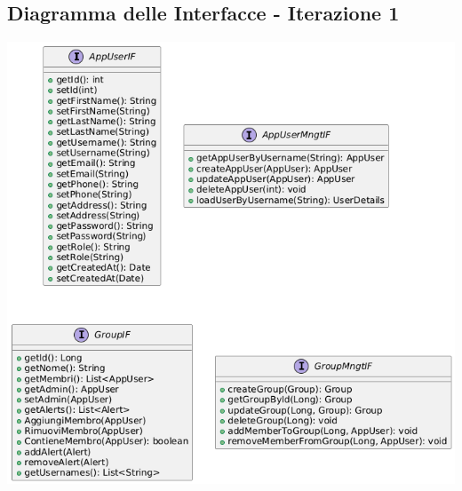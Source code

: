 \subsection{Diagramma delle Interfacce - Iterazione 1}
\hspace{1pt}
\begin{center}
    \includegraphics[scale=0.5]{images/InterfaceUML-iterazione1.png}
\end{center}
